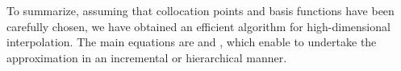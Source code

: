 To summarize, assuming that collocation points and basis functions have been
carefully chosen, we have obtained an efficient algorithm for high-dimensional
interpolation. The main equations are  and
, which enable to undertake the approximation in an
incremental or hierarchical manner.
